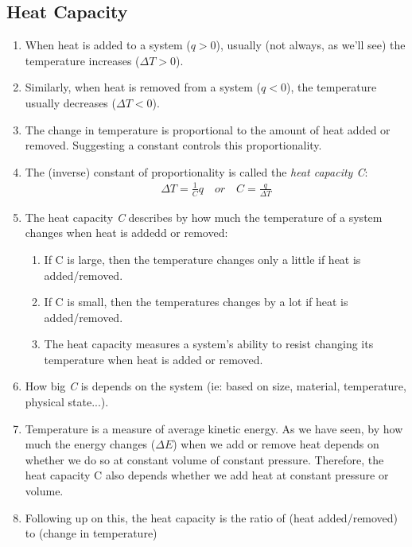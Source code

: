 \documentclass[../CHEM152Notes.tex]{subfiles}
\begin{document}
\subsection*{Heat Capacity}
\begin{enumerate}
    \item When heat is added to a system ($q > 0$), usually (not always, as we'll see) the temperature increases ($\Delta T > 0$).
    \item Similarly, when heat is removed from a system ($q < 0$), the temperature usually decreases ($\Delta T < 0$).
    \item The change in temperature is proportional to the amount of heat added or removed. Suggesting a constant controls this proportionality.
    \item The (inverse) constant of proportionality is called the \emph{heat capacity C}:
        \begin{equation*}
            \begin{aligned}
                \Delta T = \frac{1}{C}q \quad or \quad C = \frac{q}{\Delta T}
            \end{aligned}
        \end{equation*}
    \item The heat capacity \emph{C} describes by how much the temperature of a system changes when heat is addedd or removed:
        \begin{enumerate}
            \item If C is large, then the temperature changes only a little if heat is added/removed.
            \item If C is small, then the temperatures changes by a lot if heat is added/removed.
            \item The heat capacity measures a system's ability to resist changing its temperature when heat is added or removed.
        \end{enumerate}
    \item How big \emph{C} is depends on the system (ie: based on size, material, temperature, physical state...).
    \item Temperature is a measure of average kinetic energy. As we have seen, by how much the energy changes ($\Delta E$) when we add or remove heat depends on whether we do so at constant volume of constant pressure. Therefore, the heat capacity C also depends whether we add heat at constant pressure or volume.
    \item Following up on this, the heat capacity is the ratio of (heat added/removed) to (change in temperature)

\end{enumerate}
\end{document}
